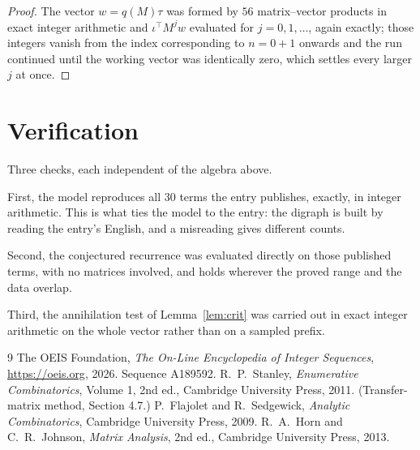 \documentclass[11pt,a4paper]{article}
\theoremstyle{plain}
\theoremstyle{definition}
\begin{document}
\begin{proof}
The vector $w=q(M)\tau$ was formed by $56$ matrix--vector products in exact integer
arithmetic and $\iota^{\!\top}M^{j}w$ evaluated for $j=0,1,\dots$, again exactly; those
integers vanish from the index corresponding to $n=0+1$ onwards and the run continued
until the working vector was identically zero, which settles every larger $j$ at once.
\end{proof}

\section{Verification}

Three checks, each independent of the algebra above.

First, the model reproduces all $30$ terms the entry publishes, exactly, in integer
arithmetic. This is what ties the model to the entry: the digraph is built by reading the
entry's English, and a misreading gives different counts.

Second, the conjectured recurrence was evaluated directly on those published terms, with no
matrices involved, and holds wherever the proved range and the data overlap.

Third, the annihilation test of Lemma~\ref{lem:crit} was carried out in exact integer
arithmetic on the whole vector rather than on a sampled prefix.

\begin{thebibliography}{9}
 The OEIS Foundation, \emph{The On-Line Encyclopedia of Integer
Sequences}, \url{https://oeis.org}, 2026. Sequence A189592.
 R.~P.~Stanley, \emph{Enumerative Combinatorics}, Volume 1, 2nd ed.,
Cambridge University Press, 2011. (Transfer-matrix method, Section 4.7.)
 P.~Flajolet and R.~Sedgewick, \emph{Analytic Combinatorics}, Cambridge
University Press, 2009.
 R.~A.~Horn and C.~R.~Johnson, \emph{Matrix Analysis}, 2nd ed., Cambridge
University Press, 2013.
\end{thebibliography}
\end{document}
